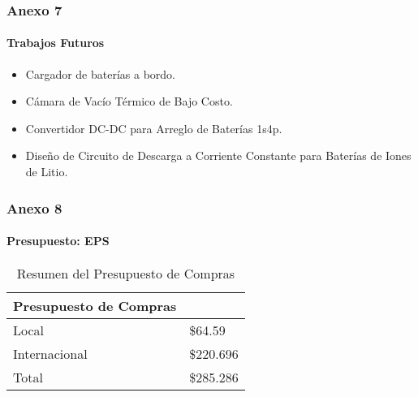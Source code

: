 
\begin{frame}
    \frametitle{Anexo 7}
    \framesubtitle{Trabajos Futuros}
    \begin{itemize}
        \item Cargador de baterías a bordo.
        \item Cámara de Vacío Térmico de Bajo Costo.
        \item Convertidor DC-DC para Arreglo de Baterías 1s4p.
        \item Diseño de Circuito de Descarga a Corriente Constante para Baterías de
        Iones de Litio.
    \end{itemize}
    
\end{frame}


\begin{frame}
    \frametitle{Anexo 8}
    \framesubtitle{Presupuesto: EPS}
 
    \begin{table}[!ht]
        \centering
        \begin{tabular}{ll}
        \hline
            \textbf{\hfill Presupuesto de Compras \hfill} &  \\ \hline
            Local & \$64.59 \\ 
            Internacional & \$220.696 \\ 
            \hline
            Total & \$285.286 \\ 
        \hline
        \end{tabular}
        \caption{Resumen del Presupuesto de Compras}
        \label{tab:presupuesto}
    \end{table}
    
    
\end{frame}

